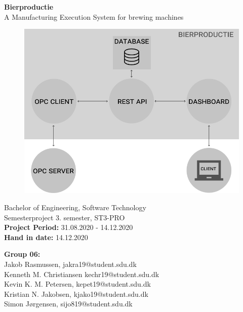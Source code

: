 \begin{titlepage}
\begin{center}
{ \LARGE \bfseries Bierproductie \\[0.4cm]}
A Manufacturing Execution System for brewing machines
\begin{figure}[H]
\centering 
\includegraphics[scale=0.4]{images/system_overview.png}
\label{figure:bierproductie_system}
\end{figure}

Bachelor of Engineering, Software Technology\\
\vspace{2mm}
Semesterproject 3. semester, ST3-PRO\\
\vspace{2mm}
\textbf{Project Period:} 31.08.2020 - 14.12.2020 \\
\vspace{2mm}
\textbf{Hand in date:} 14.12.2020 \\

\vspace{7mm}

\textbf{Group 06:} \\
\vspace{2mm}
Jakob Rasmussen, jakra19@student.sdu.dk \\
\vspace{2mm}
Kenneth M. Christiansen kechr19@student.sdu.dk \\
\vspace{2mm}
Kevin K. M. Petersen, kepet19@student.sdu.dk \\
\vspace{2mm}
Kristian N. Jakobsen, kjako19@student.sdu.dk \\
\vspace{2mm}
Simon Jørgensen, sijo819@student.sdu.dk \\


\end{center}
\end{titlepage}
